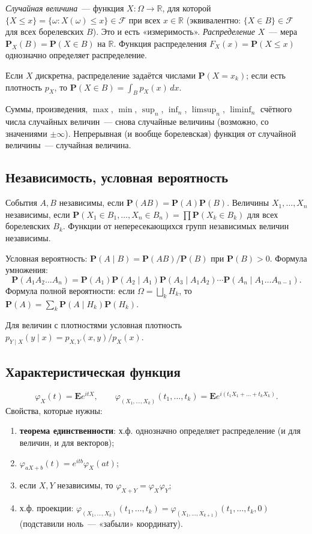 \documentclass[11pt,a4paper]{article}
\theoremstyle{definition}
\newcommand{\PP}{\mathbf P}
\newcommand{\EE}{\mathbf E}
\newcommand{\R}{\mathbb R}
\newcommand{\F}{\mathcal F}
\newcommand{\1}{\mathbf 1}
\begin{document}
\emph{Случайная величина}~--- функция $X:\Omega\to\R$, для которой
$\{X\le x\}=\{\omega: X(\omega)\le x\}\in\F$ при всех $x\in\R$ (эквивалентно:
$\{X\in B\}\in\F$ для всех борелевских $B$). Это и есть «измеримость».
\emph{Распределение} $X$~--- мера $\PP_X(B)=\PP(X\in B)$ на $\R$. Функция
распределения $F_X(x)=\PP(X\le x)$ однозначно определяет распределение.

Если $X$ дискретна, распределение задаётся числами $\PP(X=x_k)$; если есть
плотность $p_X$, то $\PP(X\in B)=\int_Bp_X(x)\,dx$.

Суммы, произведения, $\max$, $\min$, $\sup_n$, $\inf_n$, $\limsup_n$, $\liminf_n$
счётного числа случайных величин~--- снова случайные величины (возможно, со
значениями $\pm\infty$). Непрерывная (и вообще борелевская) функция от
случайной величины~--- случайная величина.

\subsection{Независимость, условная вероятность}

События $A,B$ независимы, если $\PP(AB)=\PP(A)\PP(B)$. Величины
$X_1,\dots,X_n$ независимы, если
$\PP(X_1\in B_1,\dots,X_n\in B_n)=\prod\PP(X_k\in B_k)$ для всех борелевских
$B_k$. Функции от непересекающихся групп независимых величин независимы.

Условная вероятность: $\PP(A\mid B)=\PP(AB)/\PP(B)$ при $\PP(B)>0$.
Формула умножения:
\[
\PP(A_1A_2\dots A_n)=\PP(A_1)\PP(A_2\mid A_1)\PP(A_3\mid A_1A_2)\cdots
\PP(A_n\mid A_1\dots A_{n-1}).
\]
Формула полной вероятности: если $\Omega=\bigsqcup_kH_k$, то
$\PP(A)=\sum_k\PP(A\mid H_k)\PP(H_k)$.

Для величин с плотностями условная плотность
$p_{Y\mid X}(y\mid x)=p_{X,Y}(x,y)/p_X(x)$.

\subsection{Характеристическая функция}

\[
\varphi_X(t)=\EE e^{itX},\qquad
\varphi_{(X_1,\dots,X_k)}(t_1,\dots,t_k)=\EE e^{i(t_1X_1+\dots+t_kX_k)} .
\]
Свойства, которые нужны:
\begin{enumerate}[nosep]
\item \textbf{теорема единственности}: х.ф. однозначно определяет распределение
(и для величин, и для векторов);
\item $\varphi_{aX+b}(t)=e^{itb}\varphi_X(at)$;
\item если $X,Y$ независимы, то $\varphi_{X+Y}=\varphi_X\varphi_Y$;
\item х.ф. проекции: $\varphi_{(X_1,\dots,X_{k})}(t_1,\dots,t_k)=
\varphi_{(X_1,\dots,X_{k+1})}(t_1,\dots,t_k,0)$ (подставили ноль~--- «забыли»
координату).
\end{enumerate}
\end{document}
